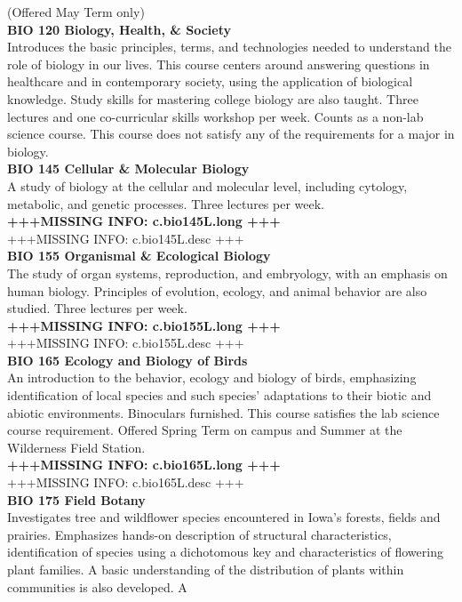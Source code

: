 \documentclass[
  letterpaper,
]{scrbook}
\begin{document}
(Offered May Term only)\\
\textbf{BIO 120 Biology, Health, \& Society}\\
Introduces the basic principles, terms, and technologies needed to
understand the role of biology in our lives. This course centers around
answering questions in healthcare and in contemporary society, using the
application of biological knowledge. Study skills for mastering college
biology are also taught. Three lectures and one co-curricular skills
workshop per week. Counts as a non-lab science course. This course does
not satisfy any of the requirements for a major in biology.\\
\textbf{BIO 145 Cellular \& Molecular Biology}\\
A study of biology at the cellular and molecular level, including
cytology, metabolic, and genetic processes. Three lectures per week.\\
\textbf{+++MISSING INFO: c.bio145L.long +++}\\
+++MISSING INFO: c.bio145L.desc +++\\
\textbf{BIO 155 Organismal \& Ecological Biology}\\
The study of organ systems, reproduction, and embryology, with an
emphasis on human biology. Principles of evolution, ecology, and animal
behavior are also studied. Three lectures per week.\\
\textbf{+++MISSING INFO: c.bio155L.long +++}\\
+++MISSING INFO: c.bio155L.desc +++\\
\textbf{BIO 165 Ecology and Biology of Birds}\\
An introduction to the behavior, ecology and biology of birds,
emphasizing identification of local species and such species'
adaptations to their biotic and abiotic environments. Binoculars
furnished. This course satisfies the lab science course requirement.
Offered Spring Term on campus and Summer at the Wilderness Field
Station.\\
\textbf{+++MISSING INFO: c.bio165L.long +++}\\
+++MISSING INFO: c.bio165L.desc +++\\
\textbf{BIO 175 Field Botany}\\
Investigates tree and wildflower species encountered in Iowa's forests,
fields and prairies. Emphasizes hands-on description of structural
characteristics, identification of species using a dichotomous key and
characteristics of flowering plant families. A basic understanding of
the distribution of plants within communities is also developed. A
\end{document}
